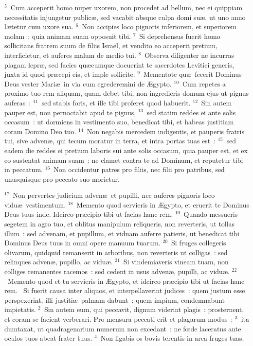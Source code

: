${}^{5}$~Cum acceperit homo nuper uxorem, non procedet ad bellum, nec ei quippiam necessitatis injungetur public\ae , sed vacabit absque culpa domi su\ae , ut uno anno l\ae tetur cum uxore sua.
${}^{6}$~Non accipies loco pignoris inferiorem, et superiorem molam~: quia animam suam opposuit tibi.
${}^{7}$~Si deprehensus fuerit homo sollicitans fratrem suum de filiis Isra\"el, et vendito eo acceperit pretium, interficietur, et auferes malum de medio tui.
${}^{8}$~Observa diligenter ne incurras plagam lepr\ae , sed facies qu\ae cumque docuerint te sacerdotes Levitici generis, juxta id quod pr\ae cepi eis, et imple sollicite.
${}^{9}$~Mementote qu\ae\ fecerit Dominus Deus vester Mari\ae\ in via cum egrederemini de \AE gypto.
${}^{10}$~Cum repetes a proximo tuo rem aliquam, quam debet tibi, non ingredieris domum ejus ut pignus auferas~:
${}^{11}$~sed stabis foris, et ille tibi proferet quod habuerit.
${}^{12}$~Sin autem pauper est, non pernoctabit apud te pignus,
${}^{13}$~sed statim reddes ei ante solis occasum~: ut dormiens in vestimento suo, benedicat tibi, et habeas justitiam coram Domino Deo tuo.
${}^{14}$~Non negabis mercedem indigentis, et pauperis fratris tui, sive adven\ae , qui tecum moratur in terra, et intra portas tuas est~:
${}^{15}$~sed eadem die reddes ei pretium laboris sui ante solis occasum, quia pauper est, et ex eo sustentat animam suam~: ne clamet contra te ad Dominum, et reputetur tibi in peccatum.
${}^{16}$~Non occidentur patres pro filiis, nec filii pro patribus, sed unusquisque pro peccato suo morietur.


${}^{17}$~Non pervertes judicium adven\ae\ et pupilli, nec auferes pignoris loco vidu\ae\ vestimentum.
${}^{18}$~Memento quod servieris in \AE gypto, et eruerit te Dominus Deus tuus inde. Idcirco pr\ae cipio tibi ut facias hanc rem.
${}^{19}$~Quando messueris segetem in agro tuo, et oblitus manipulum reliqueris, non reverteris, ut tollas illum~: sed advenam, et pupillum, et viduam auferre patieris, ut benedicat tibi Dominus Deus tuus in omni opere manuum tuarum.
${}^{20}$~Si fruges collegeris olivarum, quidquid remanserit in arboribus, non reverteris ut colligas~: sed relinques adven\ae , pupillo, ac vidu\ae .
${}^{21}$~Si vindemiaveris vineam tuam, non colliges remanentes racemos~: sed cedent in usus adven\ae , pupilli, ac vidu\ae .
${}^{22}$~Memento quod et tu servieris in \AE gypto, et idcirco pr\ae cipio tibi ut facias hanc rem.
~Si fuerit causa inter aliquos, et interpellaverint judices~: quem justum esse perspexerint, illi justiti\ae\ palmam dabunt~: quem impium, condemnabunt impietatis.
${}^{2}$~Sin autem eum, qui peccavit, dignum viderint plagis~: prosternent, et coram se facient verberari. Pro mensura peccati erit et plagarum modus~:
${}^{3}$~ita dumtaxat, ut quadragenarium numerum non excedant~: ne fœde laceratus ante oculos tuos abeat frater tuus.
${}^{4}$~Non ligabis os bovis terentis in area fruges tuas.


